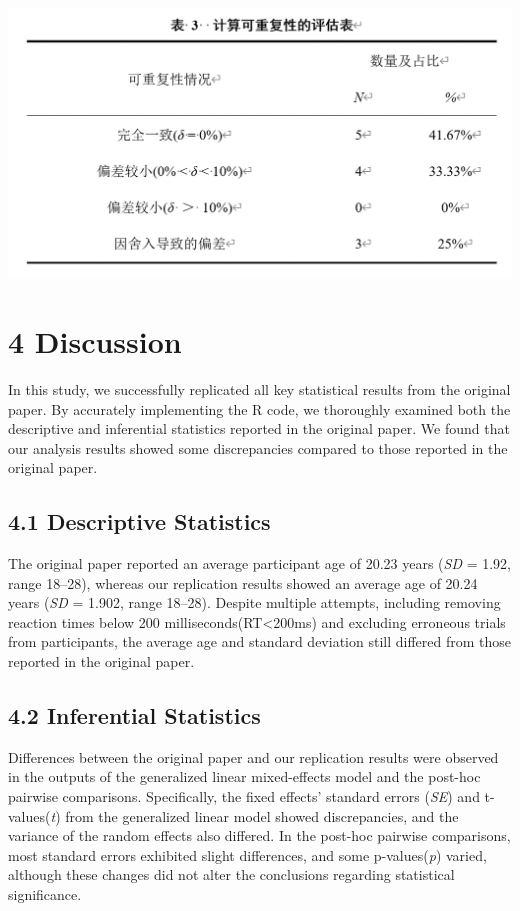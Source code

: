 \documentclass[
  man]{apa6}
\begin{document}
\includegraphics{pic/table3.png}

\section{4 Discussion}\label{discussion}

In this study, we successfully replicated all key statistical results from the original paper. By accurately implementing the R code, we thoroughly examined both the descriptive and inferential statistics reported in the original paper. We found that our analysis results showed some discrepancies compared to those reported in the original paper.

\subsection{4.1 Descriptive Statistics}\label{descriptive-statistics-1}

The original paper reported an average participant age of 20.23 years (\emph{SD} = 1.92, range 18--28), whereas our replication results showed an average age of 20.24 years (\emph{SD} = 1.902, range 18--28). Despite multiple attempts, including removing reaction times below 200 milliseconds(RT\textless200ms) and excluding erroneous trials from participants, the average age and standard deviation still differed from those reported in the original paper.

\subsection{4.2 Inferential Statistics}\label{inferential-statistics-1}

Differences between the original paper and our replication results were observed in the outputs of the generalized linear mixed-effects model and the post-hoc pairwise comparisons. Specifically, the fixed effects' standard errors (\emph{SE}) and t-values(\emph{t}) from the generalized linear model showed discrepancies, and the variance of the random effects also differed. In the post-hoc pairwise comparisons, most standard errors exhibited slight differences, and some p-values(\emph{p}) varied, although these changes did not alter the conclusions regarding statistical significance.
\end{document}
